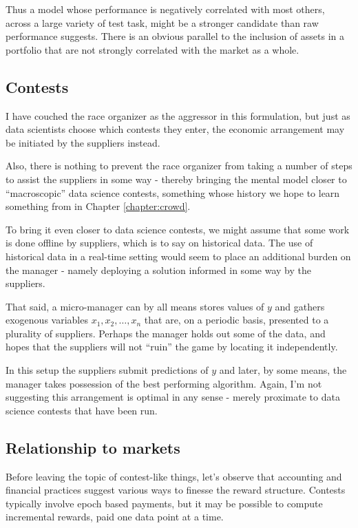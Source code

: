 Thus a model whose performance is negatively correlated with most others, across a large variety of test task, might be a stronger candidate than raw performance suggests. There is an obvious parallel to the inclusion of assets in a portfolio that are not strongly correlated with the market as a whole.  


\subsection{Contests}

I have couched the race organizer as the aggressor in this formulation, but just as data scientists choose which contests they enter, the economic arrangement may be initiated by the suppliers instead. 

Also, there is nothing to prevent the race organizer from taking a number of steps to assist the suppliers in some way - thereby bringing the mental model closer to ``macroscopic'' data science contests, something whose history we hope to learn something from in Chapter \ref{chapter:crowd}. 

To bring it even closer to data science contests, we might assume that some work is done offline by suppliers, which is to say on historical data. The use of historical data in a real-time setting would seem to place an additional burden on the manager - namely deploying a solution informed in some way by the suppliers.  

That said, a micro-manager can by all means stores values of $y$ and gathers exogenous variables $x_1,x_2,\dots,x_n$ that are, on a periodic basis, presented to a plurality of suppliers. Perhaps the manager holds out some of the data, and hopes that the suppliers will not ``ruin'' the game by locating it independently.   

In this setup the suppliers submit predictions of $y$ and later, by some means, the manager takes possession of the best performing algorithm. Again, I'm not suggesting this arrangement is optimal in any sense - merely proximate to data science contests that have been run. 




\subsection{Relationship to markets}

Before leaving the topic of contest-like things, let's observe that accounting and financial practices suggest various ways to finesse the reward structure. Contests typically involve epoch based payments, but it may be possible to compute incremental rewards, paid one data point at a time.

